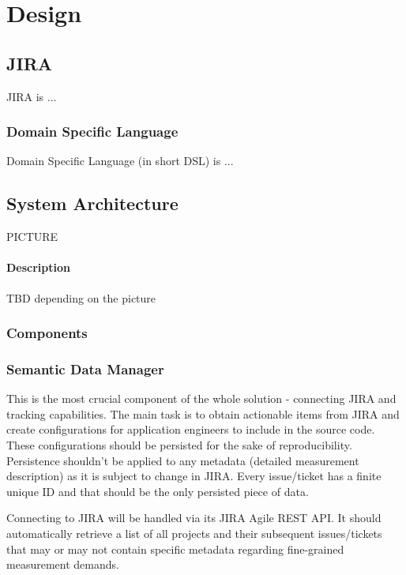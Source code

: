 \chapter{Design}

\section{JIRA}

JIRA is ...

\subsection{Domain Specific Language}

Domain Specific Language (in short DSL) is ...

\section{System Architecture}

PICTURE

\subsubsection*{Description}
TBD depending on the picture


\subsection*{Components}

\subsection{Semantic Data Manager}

This is the most crucial component of the whole solution - connecting JIRA and tracking capabilities. The main task is to obtain actionable items from JIRA and create configurations for application engineers to include in the source code. These configurations should be persisted for the sake of reproducibility. Persistence shouldn't be applied to any metadata (detailed measurement description) as it is subject to change in JIRA. Every issue/ticket has a finite unique ID and that should be the only persisted piece of data.

Connecting to JIRA will be handled via its JIRA Agile REST API. It should automatically retrieve a list of all projects and their subsequent issues/tickets that may or may not contain specific metadata regarding fine-grained measurement demands.

